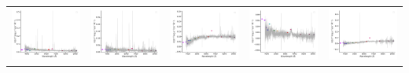 \begin{center}
\begin{longtable}{l l l l l }
    \includegraphics[width=0.2\linewidth, clip]{Figs/Figs-sdss/spec-1474-52933-0189-STRIPE82-0129-024346.pdf} & \includegraphics[width=0.2\linewidth, clip]{Figs/Figs-sdss/spec-1474-52933-0296-STRIPE82-0127-008930.pdf} & \includegraphics[width=0.2\linewidth, clip]{Figs/Figs-sdss/spec-1475-52903-0561-STRIPE82-0134-039543.pdf} & \includegraphics[width=0.2\linewidth, clip]{Figs/Figs-sdss/spec-1492-52932-0553-STRIPE82-0010-005855.pdf} & \includegraphics[width=0.2\linewidth, clip]{Figs/Figs-sdss/spec-1493-52933-0207-STRIPE82-0011-008529.pdf} \\

\end{longtable}
\end{center}
